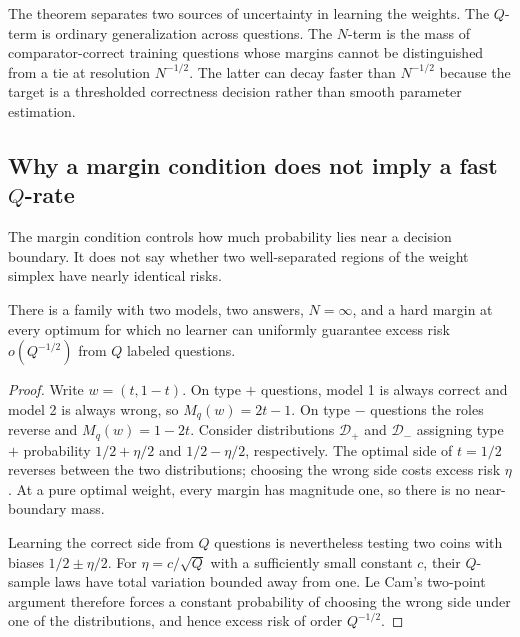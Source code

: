 The theorem separates two sources of uncertainty in learning the weights.  The
\(Q\)-term is ordinary generalization across questions.  The \(N\)-term is the
mass of comparator-correct training questions whose margins cannot be
distinguished from a tie at resolution \(N^{-1/2}\).  The latter can decay
faster than \(N^{-1/2}\) because the target is a thresholded correctness
decision rather than smooth parameter estimation.

\subsection{Why a margin condition does not imply a fast
\texorpdfstring{\(Q\)}{Q}-rate}
\label{sec:theory-obstruction}

The margin condition controls how much probability lies near a decision
boundary.  It does not say whether two well-separated regions of the weight
simplex have nearly identical risks.

\begin{proposition}
\label{prop:counterexample}
There is a family with two models, two answers, \(N=\infty\), and a hard margin
at every optimum for which no learner can uniformly guarantee excess risk
\(o(Q^{-1/2})\) from \(Q\) labeled questions.
\end{proposition}

\begin{proof}
Write \(w=(t,1-t)\).  On type \(+\) questions, model 1 is always correct and
model 2 is always wrong, so \(M_q(w)=2t-1\).  On type \(-\) questions the
roles reverse and \(M_q(w)=1-2t\).  Consider distributions
\(\mathcal D_+\) and \(\mathcal D_-\) assigning type \(+\) probability
\(1/2+\eta/2\) and \(1/2-\eta/2\), respectively.  The optimal side of
\(t=1/2\) reverses between the two distributions; choosing the wrong side
costs excess risk \(\eta\).  At a pure optimal weight, every margin has
magnitude one, so there is no near-boundary mass.

Learning the correct side from \(Q\) questions is nevertheless testing two
coins with biases \(1/2\pm\eta/2\).  For
\(\eta=c/\sqrt Q\) with a sufficiently small constant \(c\), their
\(Q\)-sample laws have total variation bounded away from one.  Le Cam's
two-point argument therefore forces a constant probability of choosing the
wrong side under one of the distributions, and hence excess risk of order
\(Q^{-1/2}\).
\end{proof}

